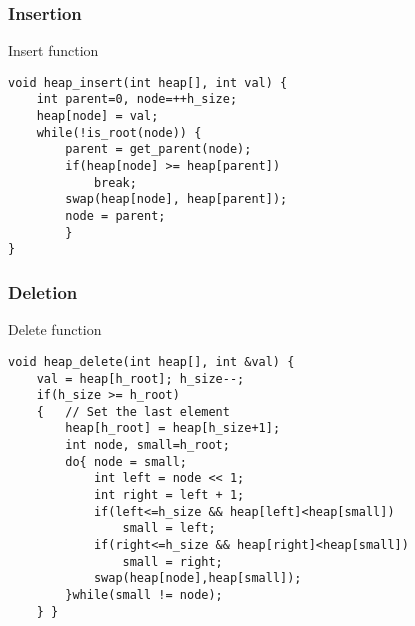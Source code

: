 \documentclass{beamer}
\begin{document}
\begin{frame}[fragile]

\frametitle{Insertion}

\begin{block}{Insert function}
\begin{lstlisting}
void heap_insert(int heap[], int val) {
    int parent=0, node=++h_size;
    heap[node] = val;
    while(!is_root(node)) {
        parent = get_parent(node);
        if(heap[node] >= heap[parent])
            break;
        swap(heap[node], heap[parent]);
        node = parent;
        }
}
\end{lstlisting}
\end{block}
\end{frame}

\begin{frame}[fragile]
\frametitle{Deletion}
\begin{block}{Delete function}
\begin{lstlisting}
void heap_delete(int heap[], int &val) {
    val = heap[h_root]; h_size--;
    if(h_size >= h_root)
    {   // Set the last element
        heap[h_root] = heap[h_size+1];
        int node, small=h_root;
        do{	node = small;
            int left = node << 1;
            int right = left + 1;
            if(left<=h_size && heap[left]<heap[small])
                small = left;
            if(right<=h_size && heap[right]<heap[small])
                small = right;
            swap(heap[node],heap[small]);
        }while(small != node);
    } }
\end{lstlisting}
\end{block}

\end{frame}

\end{document}
